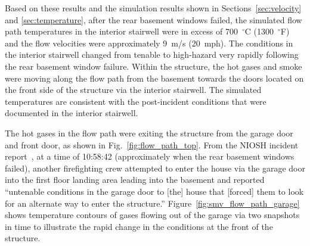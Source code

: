 \documentclass[12pt,oneside]{book}
\begin{document}
Based on these results and the simulation results shown in Sections~\ref{sec:velocity} and \ref{sec:temperature}, after the rear basement windows failed, the simulated flow path temperatures in the interior stairwell were in excess of 700~$^{\circ}$C (1300~$^{\circ}$F) and the flow velocities were approximately 9~m/s (20~mph). The conditions in the interior stairwell changed from tenable to high-hazard very rapidly following the rear basement window failure. Within the structure, the hot gases and smoke were moving along the flow path from the basement towards the doors located on the front side of the structure via the interior stairwell. The simulated temperatures are consistent with the post-incident conditions that were documented in the interior stairwell.

The hot gases in the flow path were exiting the structure from the garage door and front door, as shown in Fig.~\ref{fig:flow_path_top}. From the NIOSH incident report~\cite{NIOSH:Bowyer2}, at a time of 10:58:42 (approximately when the rear basement windows failed), another firefighting crew attempted to enter the house via the garage door into the first floor landing area leading into the basement and reported ``untenable conditions in the garage door to [the] house that [forced] them to look for an alternate way to enter the structure.'' Figure~\ref{fig:smv_flow_path_garage} shows temperature contours of gases flowing out of the garage via two snapshots in time to illustrate the rapid change in the conditions at the front of the structure.
\end{document}
